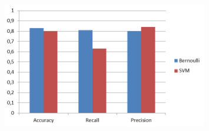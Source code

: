 \documentclass[12pt]{article}
\begin{document}
\begin{figure}[!ht]
	\centering %
	\includegraphics[width=0.8\textwidth]{metrics.png} %
	\caption{} 
	\label{fig:metrics}
\end{figure}
\end{document}
